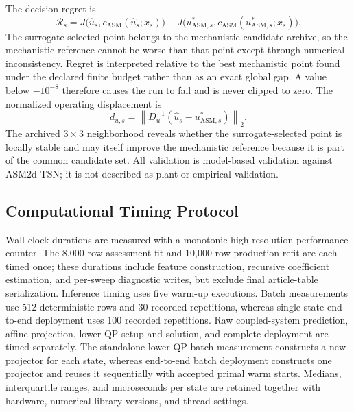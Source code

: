 \documentclass[a4paper,fleqn]{cas-sc}
\begin{document}
The decision regret is
\begin{equation}
\label{eq:decision_regret}
\mathcal R_s=
J\bigl(\widehat u_s,c_{\mathrm{ASM}}(\widehat u_s;x_s)\bigr)
-J\bigl(u_{\mathrm{ASM},s}^*,c_{\mathrm{ASM}}(u_{\mathrm{ASM},s}^*;x_s)\bigr).
\end{equation}
The surrogate-selected point belongs to the mechanistic candidate archive, so the mechanistic reference cannot be worse than that point except through numerical inconsistency. Regret is interpreted relative to the best mechanistic point found under the declared finite budget rather than as an exact global gap. A value below $-10^{-8}$ therefore causes the run to fail and is never clipped to zero. The normalized operating displacement is
\begin{equation}
\label{eq:decision_displacement}
d_{u,s}=\left\|D_u^{-1}(\widehat u_s-u_{\mathrm{ASM},s}^*)\right\|_2.
\end{equation}
The archived $3\times3$ neighborhood reveals whether the surrogate-selected point is locally stable and may itself improve the mechanistic reference because it is part of the common candidate set. All validation is model-based validation against ASM2d-TSN; it is not described as plant or empirical validation.

\subsection{Computational Timing Protocol}

Wall-clock durations are measured with a monotonic high-resolution performance counter. The 8,000-row assessment fit and 10,000-row production refit are each timed once; these durations include feature construction, recursive coefficient estimation, and per-sweep diagnostic writes, but exclude final article-table serialization. Inference timing uses five warm-up executions. Batch measurements use 512 deterministic rows and 30 recorded repetitions, whereas single-state end-to-end deployment uses 100 recorded repetitions. Raw coupled-system prediction, affine projection, lower-QP setup and solution, and complete deployment are timed separately. The standalone lower-QP batch measurement constructs a new projector for each state, whereas end-to-end batch deployment constructs one projector and reuses it sequentially with accepted primal warm starts. Medians, interquartile ranges, and microseconds per state are retained together with hardware, numerical-library versions, and thread settings.
\end{document}
